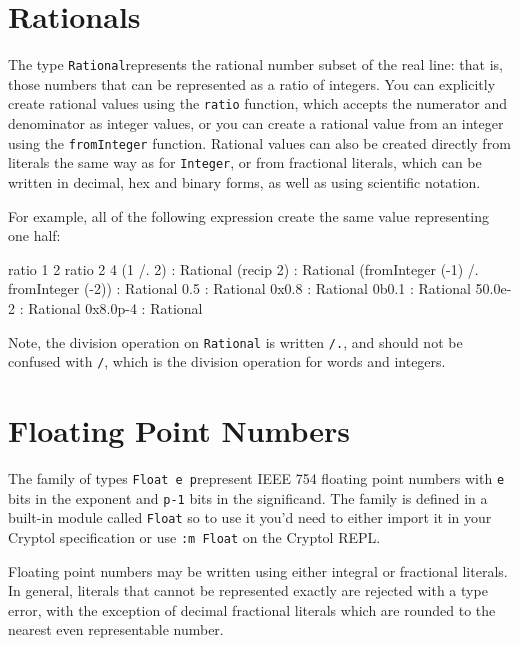 \section{Rationals}
\label{sec:rational}

The type \texttt{Rational}\indTheRationalType represents the rational number subset
of the real line: that is, those numbers that can be represented
as a ratio of integers. You can explicitly create rational values using
the \texttt{ratio} function, which accepts the numerator and denominator
as integer values, or you can create a rational value from an
integer using the \texttt{fromInteger} function.  Rational values can
also be created directly from literals the same way as for
\texttt{Integer}, or from fractional literals, which can be written
in decimal, hex and binary forms, as well as using scientific notation.

For example, all of the following expression create the same
value representing one half:
\restartrepl
\begin{replinVerb}
  ratio 1 2
  ratio 2 4
  (1 /. 2) : Rational
  (recip 2) : Rational
  (fromInteger (-1) /. fromInteger (-2)) : Rational
  0.5 : Rational
  0x0.8 : Rational
  0b0.1 : Rational
  50.0e-2 : Rational
  0x8.0p-4 : Rational
\end{replinVerb}
\restartrepl

Note, the division operation on \texttt{Rational} is
written \texttt{/.}, and should not be confused with
\texttt{/}, which is the division operation for words
and integers.


\section{Floating Point Numbers}
\label{sec:floats}

The family of types \texttt{Float e p}\indTheFloatType represent IEEE 754
floating point numbers with \texttt{e} bits in the exponent and
\texttt{p-1} bits in the significand.  The family is defined in a built-in
module called \texttt{Float} so to use it you'd need to either import
it in your Cryptol specification or use \texttt{:m Float} on the
Cryptol REPL.

Floating point numbers may be written using either integral or fractional
literals.  In general, literals that cannot be represented exactly are
rejected with a type error, with the exception of decimal fractional literals
which are rounded to the nearest even representable number.

